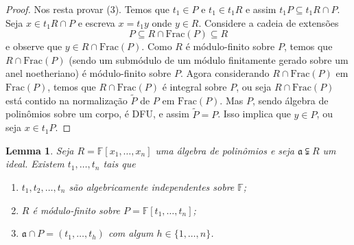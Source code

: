 \documentclass[12pt]{amsart}
\renewcommand{\a}{\mathfrak a}
\newcommand{\F}{\mathbb F}
\newcommand{\fracf}[1]{\mbox{Frac}(#1)}
\newtheorem{lemma}[theorem]{Lemma}
\begin{document}
\begin{proof}
Nos resta provar (3). Temos que $t_1\in P$ e $t_1\in t_1R$ e assim $t_1P\subseteq t_1R\cap P$. Seja 
$x\in t_1R\cap P$ e escreva $x=t_1y$ onde $y\in R$. Considere a cadeia de extensões
\[
    P\subseteq R\cap \fracf P\subseteq R  
\]
e observe que $y\in R\cap \fracf P$. 
Como $R$ é módulo-finito sobre $P$, temos que $R\cap \fracf P$ (sendo um submódulo de 
um módulo finitamente gerado sobre um anel noetheriano) é módulo-finito sobre $P$. Agora considerando 
$R\cap \fracf P$ em $\fracf P$, temos que $R\cap \fracf P$ é integral sobre $P$, ou seja $R\cap \fracf P$ está contido na normalização $\widetilde P$ de $P$ em $\fracf P$. Mas $P$, sendo álgebra de polinômios sobre um corpo, é DFU, e assim $\widetilde P=P$. Isso implica que $y\in P$, ou seja $x\in t_1P$.  
\end{proof}

\begin{lemma}\label{lemma2}
    Seja $R=\F[x_1,\ldots,x_n]$ uma álgebra de polinômios e seja $\a\subsetneqq R$ um ideal. Existem $t_1,\ldots,t_n$ tais que 
    \begin{enumerate}
        \item $t_1,t_2,\ldots,t_n$ são algebricamente independentes sobre $\F$;
        \item $R$ é módulo-finito sobre $P=\F[t_1,\ldots,t_n]$;
        \item $\a\cap P = (t_1,\ldots,t_h)$ com algum $h\in\{1,\ldots,n\}$.
    \end{enumerate} 
\end{lemma}
\end{document}
